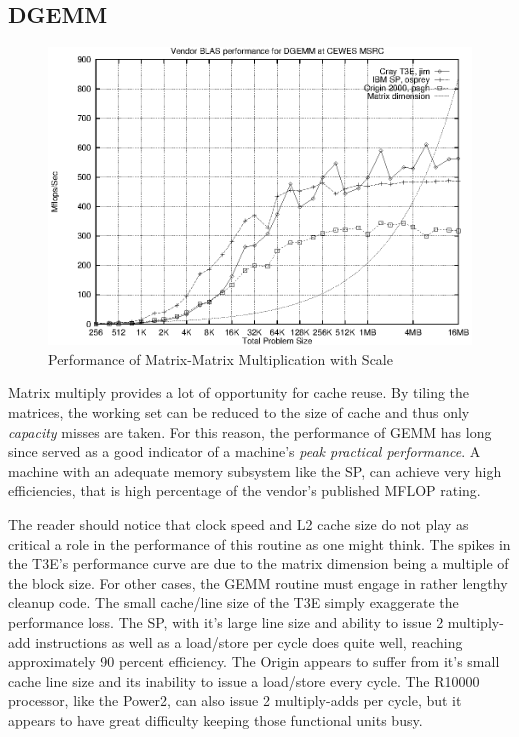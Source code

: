 \documentclass [12pt]{article}
\begin{document}
\subsection{DGEMM}
\begin{figure}[Hht]
\centerline{\includegraphics{pics/cewes_vdgemm.ps}}
\caption{Performance of Matrix-Matrix Multiplication with Scale}\label{dgemm}
\end{figure}
\clearpage
\newpage

Matrix multiply provides a lot of opportunity for cache reuse. By tiling the
matrices, the working set can be reduced to the size of cache and thus only
{\em capacity} misses are taken. For this reason, the performance of GEMM has long since served as a good indicator of a machine's {\em peak practical performance}. A machine with an adequate memory subsystem like the SP, can achieve
very high efficiencies, that is high percentage of the vendor's published MFLOP
rating. 

The reader should notice that clock speed and L2 cache size do not play as
critical a role in the performance of this routine as one might think. The 
spikes in the T3E's performance curve are due to the matrix dimension being
a multiple of the block size. For other cases, the GEMM routine must engage
in rather lengthy cleanup code. The small cache/line size of the T3E simply
exaggerate the performance loss. The SP, with it's large line size and ability
to issue 2 multiply-add instructions as well as a load/store per cycle does quite well, reaching approximately 90 percent efficiency. The Origin appears
to suffer from it's small cache line size and its inability to issue a 
load/store every cycle. The R10000 processor, like the Power2, can also issue
2 multiply-adds per cycle, but it appears to have great difficulty 
keeping those functional units busy. 
\end{document}
